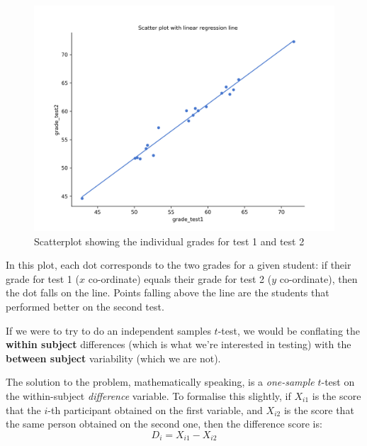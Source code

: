 \documentclass[
  11pt,
  a4paper,
  twoside,symmetric,openright]{book}
\theoremstyle{break}
\theoremstyle{break}
\begin{document}
\begin{figure}

{\centering \includegraphics[width=0.6\linewidth]{resources/image/cogstatchicoscatter} 

}

\caption{Scatterplot showing the individual grades for test 1 and test 2}\label{fig:pairedtb}
\end{figure}

In this plot, each dot corresponds to the two grades for a given student: if their grade for test 1 (\(x\) co-ordinate) equals their grade for test 2 (\(y\) co-ordinate), then the dot falls on the line. Points falling above the line are the students that performed better on the second test.

If we were to try to do an independent samples \(t\)-test, we would be conflating the \textbf{within subject} differences (which is what we're interested in testing) with the \textbf{between subject} variability (which we are not).

The solution to the problem, mathematically speaking, is a \emph{one-sample} \(t\)-test on the within-subject \emph{difference} variable. To formalise this slightly, if \(X_{i1}\) is the score that the \(i\)-th participant obtained on the first variable, and \(X_{i2}\) is the score that the same person obtained on the second one, then the difference score is:
\[
D_{i} = X_{i1} - X_{i2}
\]
\end{document}
